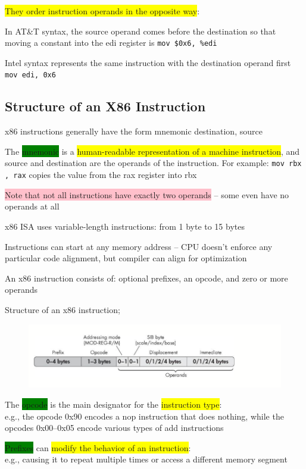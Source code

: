 \documentclass[]{project_plan}
\begin{document}
\colorbox{yellow}{They order instruction operands in the opposite way}:

In AT\&T syntax, the source operand comes before the destination so that moving a constant into the edi
register is \lstinline|mov $0x6, %edi|

Intel syntax represents the same instruction with the destination operand first
\lstinline|mov edi, 0x6|

\subsection{Structure of an X86 Instruction}

x86 instructions generally have the form mnemonic destination, source

The \colorbox{green}{mnemonic} is a \colorbox{yellow}{human-readable representation of a machine instruction}, and source and
destination are the operands of the instruction. For example: \lstinline|mov rbx , rax|
copies the value from the rax register into rbx

\colorbox{pink}{Note that not all instructions have exactly two operands} – some even have no
operands at all

x86 ISA uses variable-length instructions: from 1 byte to 15 bytes

Instructions can start at any memory address – CPU doesn’t enforce any particular code alignment,
but compiler can align for optimization

An x86 instruction consists of: optional prefixes, an opcode, and zero or more operands

Structure of an x86 instruction;
\begin{figure}[H]
  \centering
  \includegraphics[width=.8\linewidth]{strcuture_x86_instruction.png}
\end{figure}

The \colorbox{green}{opcode} is the main designator for the \colorbox{yellow}{instruction type}:\\
e.g., the opcode 0x90 encodes a nop instruction that does nothing, while the opcodes
0x00--0x05 encode various types of add instructions

\colorbox{green}{Prefixes} can \colorbox{yellow}{modify the behavior of an instruction}:\\
e.g., causing it to repeat multiple times or access a different memory segment
\end{document}
